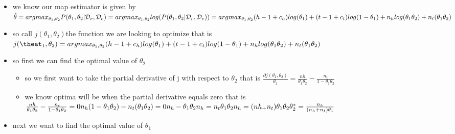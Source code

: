 \documentclass{article}
\theoremstyle{plain}
\theoremstyle{definition}
\begin{document}
\begin{enumerate}
\begin{itemize}
\begin{itemize}
       \item then as we know the log is a monotonic function we can take the log of our posterior and still achieve the same optimal values of $\theta$ while making our computation more simple and stable $log(P(\theta_1,\theta_2|\mathcal{D}_{r}, \mathcal{D}_{c}))\propto log((\theta_1)^{h-1+c_h}(1-\theta_1)^{t-1+c_t}(\theta_1\theta_2)^{n_h}(1-\theta_1\theta_2)^{nt}P(\theta_2)\propto (\theta_1)^{h-1+c_h}(1-\theta_1)^{t-1+c_t}(\theta_1\theta_2)^{n_h}(1-\theta_1\theta_2)^{nt})=(h-1+c_h)log(\theta_1)+(t-1+c_t)log(1-\theta_1)+n_hlog(\theta_1\theta_2)+n_t(\theta_1\theta_2)$
   \end{itemize}
\item we know our map estimator is given by \\$\hat{\theta}=argmax_{\theta_1,\theta_2}P(\theta_1,\theta_2|\mathcal{D}_{r},\mathcal{D}_{e})\\=argmax_{\theta_1,\theta_2}log(P(\theta_1,\theta_2|\mathcal{D}_{r},\mathcal{D}_{e}))\\= argmax_{\theta_1,\theta_2}(h-1+c_h)log(\theta_1)+(t-1+c_t)log(1-\theta_1)+n_hlog(\theta_1\theta_2)+n_t(\theta_1\theta_2)$
\item so call $j(\theta_1,\theta_2) $the function we are looking to optimize that is $j(\theat_1, \theta_2)=argmax_{\theta_1,\theta_2}(h-1+c_h)log(\theta_1)+(t-1+c_t)log(1-\theta_1)+n_hlog(\theta_1\theta_2)+n_t(\theta_1\theta_2)$
\item so first we can find the optimal value of $\theta_2$
\begin{itemize}
    \item so we first want to take the partial derivative of j with respect to $\theta_2$ that is $\frac{\partial j(\theta_1,\theta_2)}{\theta_2}=\frac{nh}{\theta_1\theta_2}-\frac{n_t}{1-\theta_1\theta_2}$
        \item we know optima will be when the partial derivative equals zero that is \\ $\frac{nh}{\theta_1\theta_2}-\frac{n_t}{1-\theta_1\theta_2}=0\\n_h(1-\theta_1\theta_2)-n_t(\theta_1\theta_2)=0
        \\ n_h-\theta_1\theta_2n_h=n_t\theta_1\theta_2\\
        n_h=(nh_+n_t)\theta_1\theta_2
        \\ \theta_2^{*}=\frac{n_h}{(n_h+n_t)\theta_1}$
\end{itemize}
\item next we want to find the optimal value of $\theta_1$
\begin{itemize}

\end{itemize}
\end{itemize}
\end{enumerate}
\end{document}
